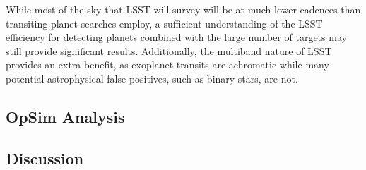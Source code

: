 While most of the sky that LSST will survey will be at much lower cadences than transiting planet searches employ, a sufficient understanding of the LSST efficiency for detecting planets combined with the large number of targets may still provide significant results. Additionally, the multiband nature of LSST provides an extra benefit, as exoplanet transits are achromatic while many potential astrophysical false positives, such as binary stars, are not. 




\subsection{OpSim Analysis}
\label{sec:\secname:analysis}




\subsection{Discussion}
\label{sec:\secname:discussion}


\navigationbar
